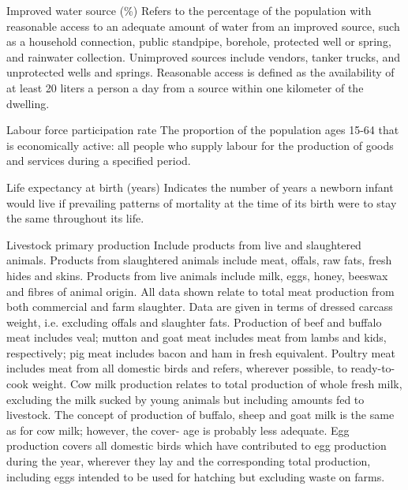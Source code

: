 \begin{MetadataCollection} {}
\begin{metadata}{Improved water source (\%)} {}
Refers to the percentage of the population with reasonable access to an adequate amount of water from an improved source, such as a household connection, public standpipe, borehole, protected well or spring, and rainwater collection. Unimproved sources include vendors, tanker trucks, and unprotected wells and springs. Reasonable access is defined as the availability of at least 20 liters a person a day from a source within one kilometer of the dwelling.
\end{metadata}

\begin{metadata}{Labour force participation rate} {}
The proportion of the population ages 15-64 that is economically active: all people who supply labour for the production of goods and services during a specified period.
\end{metadata}

\begin{metadata}{Life expectancy at birth (years)} {}
Indicates the number of years a newborn infant would live if prevailing patterns of mortality at the time of its birth were to stay the same throughout its life.
\end{metadata}

\begin{metadata}{Livestock primary production} {}
Include products from live and slaughtered animals. Products from slaughtered animals include meat, offals, raw fats, fresh hides and skins.  Products from live animals include milk, eggs, honey, beeswax and fibres of animal origin. All data shown relate to total meat production from both commercial and farm slaughter. Data are given in terms of dressed carcass weight, i.e. excluding offals and slaughter fats. Production of beef and buffalo meat includes veal; mutton and goat meat includes meat from lambs and kids, respectively; pig meat includes bacon and ham in fresh equivalent. Poultry meat includes meat from all domestic birds and refers, wherever possible, to ready-to-cook weight. Cow milk production relates to total production of whole fresh milk, excluding the milk sucked by young animals but including amounts fed to livestock. The concept of production of buffalo, sheep and goat milk is the same as for cow milk; however, the cover- age is probably less adequate. Egg production covers all domestic birds which have contributed to egg production during the year, wherever they lay and the corresponding total production, including eggs intended to be used for hatching but excluding waste on farms.
\end{metadata}


\end{MetadataCollection}
